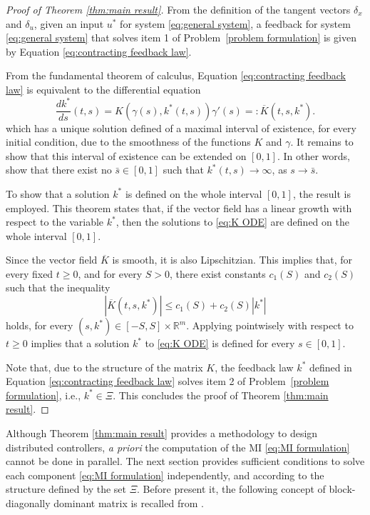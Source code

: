 \documentclass[10pt,twocolumn,twoside]{IEEEtran}
\theoremstyle{plain}
\theoremstyle{definition}
\theoremstyle{remark}
\begin{document}
\begin{proof}[Proof of Theorem \ref{thm:main result}]
	From the definition of the tangent vectors $\delta_x$ and $\delta_u$, given an input $u^\ast$ for system \eqref{eq:general system}, a feedback for system \eqref{eq:general system} that solves item 1 of Problem~\ref{problem formulation} is given by Equation \eqref{eq:contracting feedback law}. 
	
	From the fundamental theorem of calculus, Equation \eqref{eq:contracting feedback law} is equivalent to the differential equation
	\begin{equation}\label{eq:K ODE}
		\frac{dk^\ast}{ds}(t,s)=K(\gamma(s),k^\ast(t,s))\gamma'(s)=:\overline{K}(t,s,k^\ast).
	\end{equation}
	which has a unique solution defined of a maximal interval of existence, for every initial condition, due to the smoothness of the functions $K$ and $\gamma$. It remains to show that this interval of existence can be extended on $[0,1]$. In other words, show that there exist no $\bar{s}\in[0,1]$ such that $k^\ast(t,s)\to\infty$, as $s\to\bar{s}$.
	
	To show that a solution $k^\ast$ is defined on the whole interval $[0,1]$, the result  \cite[Theorem 2.12]{Teschl2012} is employed. This theorem states that, if the vector field has a linear growth with respect to the variable $k^\ast$, then the solutions to \eqref{eq:K ODE} are defined on the whole interval $[0,1]$.
		
	Since the vector field $\overline{K}$ is smooth, it is also Lipschitzian. This implies that, for every fixed $t\geq0$, and for every $S>0$, there exist constants $c_1(S)$ and $c_2(S)$ such that the inequality
	\begin{equation*}
		\left|\overline{K}(t,s,k^\ast)\right|\leq c_1(S)+c_2(S)|k^\ast|
	\end{equation*}
	holds, for every $(s,k^\ast)\in [-S,S]\times\mathbb{R}^m$. Applying \cite[Theorem 2.12]{Teschl2012} pointwisely with respect to $t\geq0$ implies that a solution $k^\ast$ to \eqref{eq:K ODE} is defined for every $s\in[0,1]$.
	
	Note that, due to the structure of the matrix $K$, the feedback law $k^\ast$ defined in Equation \eqref{eq:contracting feedback law} solves item 2 of Problem~\ref{problem formulation}, i.e., $k^\ast\in\Xi$. This concludes the proof of Theorem \ref{thm:main result}.
\end{proof}

Although Theorem \ref{thm:main result} provides a methodology to design distributed controllers, \emph{a priori} the computation of the MI \eqref{eq:MI formulation}  cannot be done in parallel. The next section provides sufficient conditions to solve each component \eqref{eq:MI formulation} independently, and according to the structure defined by the set $\Xi$. Before present it, the following concept of block-diagonally dominant matrix is recalled from \cite{ZhangLiChen2006}.
\end{document}
